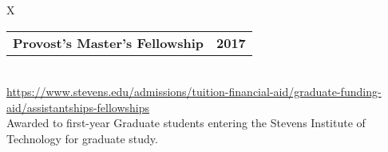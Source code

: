 \documentclass[10pt]{article}
\newcommand{\tabularxwidth}{\textwidth}
\begin{document}
    

    
        
            \begin{minipage}{\tabularxwidth}
            \begin{tabularx}{\tabularxwidth}{X}
                {
                    \begin{tabularx}{\tabularxwidth}{@{}X r}
                        \textbf{Provost's Master's Fellowship} &
                        \textbf{
        2017} \\
                    \end{tabularx}
                } \\
                    \url{https://www.stevens.edu/admissions/tuition-financial-aid/graduate-funding-aid/assistantships-fellowships} \\
                
                    
    Awarded to first-year Graduate students entering the Stevens Institute of Technology for graduate study. \\
                
            \end{tabularx}

            
                \vspace{.5em}
            

            

            \end{minipage}
        
    
        
\end{document}
